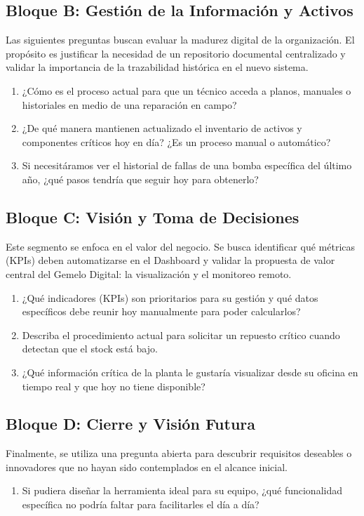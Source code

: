 \documentclass[12pt, a4paper]{article}
\begin{document}
\subsection{Bloque B: Gestión de la Información y Activos}
Las siguientes preguntas buscan evaluar la madurez digital de la organización. El propósito es justificar la necesidad de un repositorio documental centralizado y validar la importancia de la trazabilidad histórica en el nuevo sistema.

\begin{enumerate}
    \item ¿Cómo es el proceso actual para que un técnico acceda a planos, manuales o historiales en medio de una reparación en campo?
    \item ¿De qué manera mantienen actualizado el inventario de activos y componentes críticos hoy en día? ¿Es un proceso manual o automático?
    \item Si necesitáramos ver el historial de fallas de una bomba específica del último año, ¿qué pasos tendría que seguir hoy para obtenerlo?
\end{enumerate}

\subsection{Bloque C: Visión y Toma de Decisiones}
Este segmento se enfoca en el valor del negocio. Se busca identificar qué métricas (KPIs) deben automatizarse en el Dashboard y validar la propuesta de valor central del Gemelo Digital: la visualización y el monitoreo remoto.

\begin{enumerate}
    \item ¿Qué indicadores (KPIs) son prioritarios para su gestión y qué datos específicos debe reunir hoy manualmente para poder calcularlos?
    \item Describa el procedimiento actual para solicitar un repuesto crítico cuando detectan que el stock está bajo.
    \item ¿Qué información crítica de la planta le gustaría visualizar desde su oficina en tiempo real y que hoy no tiene disponible?
\end{enumerate}

\subsection{Bloque D: Cierre y Visión Futura}
Finalmente, se utiliza una pregunta abierta para descubrir requisitos deseables o innovadores que no hayan sido contemplados en el alcance inicial.

\begin{enumerate}
    \item Si pudiera diseñar la herramienta ideal para su equipo, ¿qué funcionalidad específica no podría faltar para facilitarles el día a día?
\end{enumerate}

\clearpage
\printbibliography[heading=bibintoc,title=Referencias]
\end{document}
